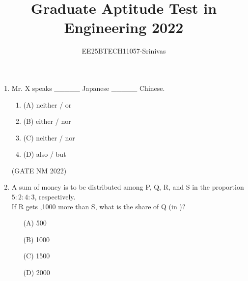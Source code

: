 \documentclass[journal,12pt,onecolumn]{IEEEtran}
\title{Graduate Aptitude Test in Engineering 2022}
\author{EE25BTECH11057-Srinivas}
\theoremstyle{remark}
\begin{document}
{\maketitle}




\begin{enumerate}
	\item  Mr. X speaks \_\_\_\_\_   Japanese \_\_\_\_\_  Chinese.\\[8pt]
		\begin{multicols}{2}

\begin {enumerate}

\item [(A)] neither / or \\
\item [(B)] either / nor \\
\item [(C)] neither / nor \\
\item [(D)] also / but \\

\end{enumerate}
\end{multicols}

\hfill(GATE NM 2022) \\





\item  A sum of money is to be distributed among P, Q, R, and S in the proportion $5 : 2 : 4 : 3$, respectively.\\[6pt]
If R gets \rupee,1000 more than S, what is the share of Q (in \rupee)?\\[8pt]

\begin{multicols}{4}

\begin{enumerate}

	\item[(A)] 500 \\
	\item[(B)] 1000 \\
	\item[(C)] 1500 \\
	\item[(D)] 2000 \\

\end{enumerate}

\end{multicols}


\end{enumerate}
\end{document}
